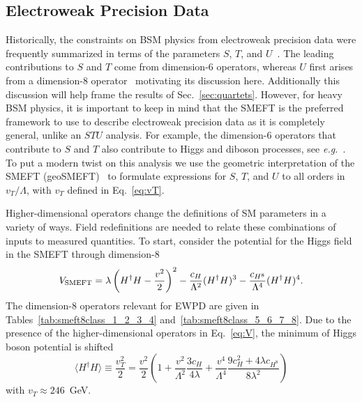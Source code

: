 \subsection{Electroweak Precision Data}

Historically, the constraints on BSM physics from electroweak precision data were frequently summarized in terms of the parameters $S$, $T$, and $U$~\cite{Peskin:1990zt, Marciano:1990dp, Kennedy:1990ib, Holdom:1990tc, Golden:1990ig, Altarelli:1990zd}.
The leading contributions to $S$ and $T$ come from dimension-6 operators, whereas $U$ first arises from a dimension-8 operator~\cite{Grinstein:1991cd} motivating its discussion here.
Additionally this discussion will help frame the results of Sec.~\ref{sec:quartets}.
However, for heavy BSM physics, it is important to keep in mind that the SMEFT is the preferred framework to use to describe electroweak precision data as it is completely general, unlike an $STU$ analysis.
For example, the dimension-6 operators that contribute to $S$ and $T$ also contribute to Higgs and diboson processes, see \textit{e.g.}~\cite{Ellis:2018gqa}.
To put a modern twist on this analysis we use the geometric interpretation of the SMEFT (geoSMEFT)~\cite{Helset:2018fgq, Helset:2020yio, Hays:2020scx} to formulate expressions for $S$, $T$, and $U$ to all orders in $v_T / \Lambda$, with $v_T$ defined in Eq.~\eqref{eq:vT}.

Higher-dimensional operators change the definitions of SM parameters in a variety of ways.
Field redefinitions are needed to relate these combinations of inputs to measured quantities.
To start, consider the potential for the Higgs field in the SMEFT through dimension-8
\begin{equation}
\label{eq:V}
V_{\rm SMEFT} = \lambda \left(H^\dag H - \frac{v^2}{2}\right)^2 - \frac{c_H}{\Lambda^2} (H^\dag H)^3 - \frac{c_{H^8}}{\Lambda^4} (H^\dag H)^4 .
\end{equation}
The dimension-8 operators relevant for EWPD are given in Tables~\ref{tab:smeft8class_1_2_3_4} and~\ref{tab:smeft8class_5_6_7_8}.
Due to the presence of the higher-dimensional operators in Eq.~\eqref{eq:V}, the minimum of Higgs boson potential is shifted~\cite{Hays:2018zze, Helset:2020yio}
\begin{equation}
\label{eq:vT}
\langle H^\dag H \rangle \equiv \frac{v_T^2}{2} = \frac{v^2}{2}\left(1 + \frac{v^2}{\Lambda^2} \frac{3 c_H}{4 \lambda} + \frac{v^4}{\Lambda^4} \frac{9 c_H^2 + 4 \lambda c_{H^8}}{8 \lambda^2} \right)
\end{equation}
with $v_T \approx 246$~GeV.

